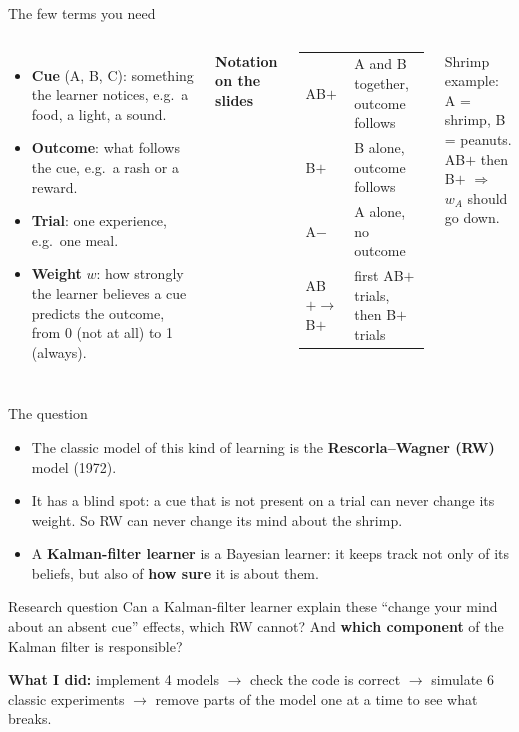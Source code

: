\documentclass[aspectratio=169,11pt]{beamer}
\begin{document}
\begin{frame}{The few terms you need}
\begin{columns}[T]
\begin{itemize}\small
\item \textbf{Cue} (A, B, C): something the learner notices, e.g.\ a food, a light, a sound.
\item \textbf{Outcome}: what follows the cue, e.g.\ a rash or a reward.
\item \textbf{Trial}: one experience, e.g.\ one meal.
\item \textbf{Weight} $w$: how strongly the learner believes a cue predicts the outcome, from 0 (not at all) to 1 (always).
\end{itemize}
\textbf{Notation on the slides}
\vspace{0.3em}

\small
\begin{tabular}{@{}ll@{}}
\toprule
AB$+$ & A and B together, outcome follows\\
B$+$ & B alone, outcome follows\\
A$-$ & A alone, no outcome\\
AB$+\to$B$+$ & first AB$+$ trials, then B$+$ trials\\
\bottomrule
\end{tabular}

\vspace{0.6em}
\small Shrimp example: A = shrimp, B = peanuts.\\
AB$+$ then B$+$ $\Rightarrow$ $w_A$ should go \alert{down}.
\end{columns}
\end{frame}

\begin{frame}{The question}
\begin{itemize}
\item The classic model of this kind of learning is the \textcolor{rw}{\textbf{Rescorla--Wagner (RW)}} model (1972).
\item It has a blind spot: a cue that is \alert{not present} on a trial can never change its weight.
So RW can never change its mind about the shrimp.
\item A \textcolor{kal}{\textbf{Kalman-filter learner}} is a Bayesian learner: it keeps track not only of its beliefs,
but also of \textbf{how sure} it is about them.
\end{itemize}
\vspace{0.4em}
\begin{block}{Research question}
Can a Kalman-filter learner explain these ``change your mind about an absent cue'' effects,
which RW cannot? And \textbf{which component} of the Kalman filter is responsible?
\end{block}
\vspace{0.3em}
\small\textbf{What I did:} implement 4 models $\to$ check the code is correct $\to$ simulate 6 classic
experiments $\to$ remove parts of the model one at a time to see what breaks.
\end{frame}
\end{document}
